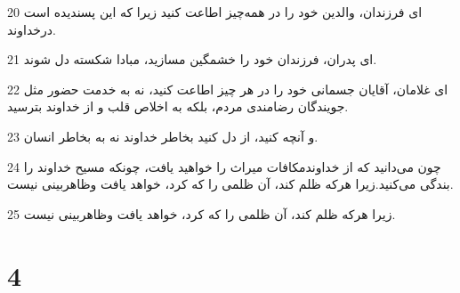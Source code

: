 \par 20 ‌ای فرزندان، والدین خود را در همه‌چیز اطاعت کنید زیرا که این پسندیده است درخداوند.
\par 21 ‌ای پدران، فرزندان خود را خشمگین مسازید، مبادا شکسته دل شوند.
\par 22 ‌ای غلامان، آقایان جسمانی خود را در هر چیز اطاعت کنید، نه به خدمت حضور مثل جویندگان رضامندی مردم، بلکه به اخلاص قلب و از خداوند بترسید.
\par 23 و آنچه کنید، از دل کنید بخاطر خداوند نه به بخاطر انسان.
\par 24 چون می‌دانید که از خداوندمکافات میراث را خواهید یافت، چونکه مسیح خداوند را بندگی می‌کنید.زیرا هرکه ظلم کند، آن ظلمی را که کرد، خواهد یافت وظاهربینی نیست.
\par 25 زیرا هرکه ظلم کند، آن ظلمی را که کرد، خواهد یافت وظاهربینی نیست.

\chapter{4}

